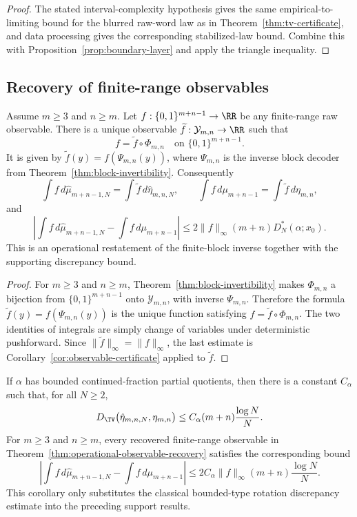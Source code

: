 \begin{proof}
The stated interval-complexity hypothesis gives the same empirical-to-limiting
bound for the blurred raw-word law as in Theorem~\ref{thm:tv-certificate}, and
data processing gives the corresponding stabilized-law bound. Combine this with
Proposition~\ref{prop:boundary-layer} and apply the triangle inequality.
\end{proof}

\subsection{Recovery of finite-range observables}

\begin{theorem}\label{thm:operational-observable-recovery}
Assume $m\ge3$ and $n\ge m$.  Let
$f:\{0,1\}^{m+n-1}\to\RR$ be any finite-range raw observable.  There is a
unique observable $\widetilde f:\mathcal Y_{m,n}\to\RR$ such that
\[
f=\widetilde f\circ\Phi_{m,n}
\quad\text{on }\{0,1\}^{m+n-1}.
\]
It is given by $\widetilde f(y)=f(\Psi_{m,n}(y))$, where
$\Psi_{m,n}$ is the inverse block decoder from
Theorem~\ref{thm:block-invertibility}.  Consequently
\[
\int f\,d\hat{\mu}_{m+n-1,N}
=
\int \widetilde f\,d\hat{\eta}_{m,n,N},
\qquad
\int f\,d\mu_{m+n-1}
=
\int \widetilde f\,d\eta_{m,n},
\]
and
\[
\left|
\int f\,d\hat{\mu}_{m+n-1,N}
-
\int f\,d\mu_{m+n-1}
\right|
\le
2\|f\|_\infty (m+n)D_N^*(\alpha;x_0).
\]
This is an operational restatement of the finite-block inverse together with
the supporting discrepancy bound.
\end{theorem}

\begin{proof}
For $m\ge3$ and $n\ge m$, Theorem~\ref{thm:block-invertibility} makes
$\Phi_{m,n}$ a bijection from $\{0,1\}^{m+n-1}$ onto
$\mathcal Y_{m,n}$, with inverse $\Psi_{m,n}$.  Therefore the formula
$\widetilde f(y)=f(\Psi_{m,n}(y))$ is the unique function satisfying
$f=\widetilde f\circ\Phi_{m,n}$.  The two identities of integrals are simply
change of variables under deterministic pushforward.  Since
$\|\widetilde f\|_\infty=\|f\|_\infty$, the last estimate is
Corollary~\ref{cor:observable-certificate} applied to $\widetilde f$.
\end{proof}

\begin{corollary}\label{cor:tv-bounded-type}
If $\alpha$ has bounded continued-fraction partial quotients, then there is a
constant $C_\alpha$ such that, for all $N\ge2$,
\[
D_{\TV}\bigl(\hat{\eta}_{m,n,N},\eta_{m,n}\bigr)
\le
C_\alpha(m+n)\frac{\log N}{N}.
\]
For $m\ge3$ and $n\ge m$, every recovered finite-range observable in
Theorem~\ref{thm:operational-observable-recovery} satisfies the corresponding
bound
\[
\left|
\int f\,d\hat{\mu}_{m+n-1,N}
-
\int f\,d\mu_{m+n-1}
\right|
\le
2C_\alpha\|f\|_\infty(m+n)\frac{\log N}{N}.
\]
This corollary only substitutes the classical bounded-type rotation
discrepancy estimate into the preceding support results.
\end{corollary}

